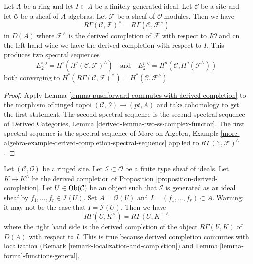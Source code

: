 \begin{lemma}
\label{lemma-formal-functions-general}
Let $A$ be a ring and let $I \subset A$ be a finitely generated ideal.
Let $\mathcal{C}$ be a site and let $\mathcal{O}$ be a sheaf
of $A$-algebras. Let $\mathcal{F}$ be a sheaf of $\mathcal{O}$-modules.
Then we have
$$
R\Gamma(\mathcal{C}, \mathcal{F})^\wedge =
R\Gamma(\mathcal{C}, \mathcal{F}^\wedge)
$$
in $D(A)$ where $\mathcal{F}^\wedge$ is the derived
completion of $\mathcal{F}$ with respect to $I\mathcal{O}$ and on the
left hand wide we have the derived completion with respect to $I$.
This produces two spectral sequences
$$
E_2^{i, j} = H^i(H^j(\mathcal{C}, \mathcal{F})^\wedge)
\quad\text{and}\quad
E_2^{p, q} = H^p(\mathcal{C}, H^q(\mathcal{F}^\wedge))
$$
both converging to
$H^*(R\Gamma(\mathcal{C}, \mathcal{F})^\wedge) =
H^*(\mathcal{C}, \mathcal{F}^\wedge)$
\end{lemma}

\begin{proof}
Apply Lemma \ref{lemma-pushforward-commutes-with-derived-completion}
to the morphism of ringed topoi $(\mathcal{C}, \mathcal{O}) \to (pt, A)$
and take cohomology to get the first statement. The second spectral sequence
is the second spectral sequence of
Derived Categories, Lemma \ref{derived-lemma-two-ss-complex-functor}.
The first spectral sequence is the spectral sequence of
More on Algebra, Example
\ref{more-algebra-example-derived-completion-spectral-sequence}
applied to $R\Gamma(\mathcal{C}, \mathcal{F})^\wedge$.
\end{proof}

\begin{remark}
\label{remark-local-calculation-derived-completion}
Let $(\mathcal{C}, \mathcal{O})$ be a ringed site.
Let $\mathcal{I} \subset \mathcal{O}$ be a finite type sheaf of
ideals. Let $K \mapsto K^\wedge$ be the derived completion of
Proposition \ref{proposition-derived-completion}.
Let $U \in \mathop{\mathrm{Ob}}\nolimits(\mathcal{C})$ be an object such that $\mathcal{I}$
is generated as an ideal sheaf by $f_1, \ldots, f_r \in \mathcal{I}(U)$.
Set $A = \mathcal{O}(U)$ and $I = (f_1, \ldots, f_r) \subset A$.
Warning: it may not be the case that $I = \mathcal{I}(U)$.
Then we have
$$
R\Gamma(U, K^\wedge) = R\Gamma(U, K)^\wedge
$$
where the right hand side is the derived completion of
the object $R\Gamma(U, K)$ of $D(A)$ with respect to $I$.
This is true because derived completion commutes with localization
(Remark \ref{remark-localization-and-completion}) and
Lemma \ref{lemma-formal-functions-general}.
\end{remark}








